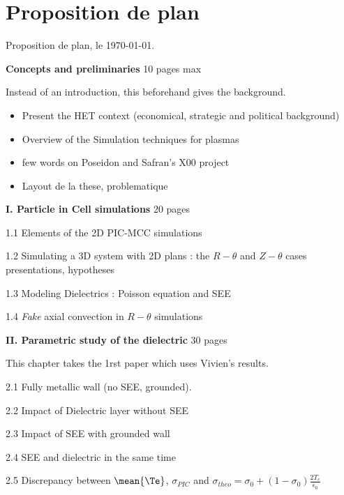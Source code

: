 



\chapter*{Proposition de plan}

Proposition de plan, le \today.
\linebreak

{\bf Concepts and preliminaries} 10 pages max
\begin{zzz}
  Instead of an introduction, this beforehand gives the background.
  \begin{itemize}
    \item Present the HET context (economical, strategic and political background)
    \item Overview of the Simulation techniques for plasmas
    \item few words on {\sc Poseidon} and Safran's X00 project
    \item Layout de la these, problematique
  \end{itemize}
\end{zzz}

{\bf I. Particle in Cell simulations} 20 pages
\begin{zzz}
  1.1 Elements of the 2D PIC-MCC simulations

  1.2 Simulating a 3D system with 2D plans : the {\bf $R-\theta$} and {\bf $Z-\theta$} cases presentations, hypotheses

  1.3 Modeling Dielectrics : Poisson equation and SEE

  1.4 {\it Fake} axial convection in {\bf $R-\theta$} simulations
\end{zzz}

{\bf II. Parametric study of the dielectric} 30 pages
\begin{zzz}
  This chapter takes the 1rst paper which uses Vivien's results.

  2.1 Fully metallic wall (no SEE, grounded).

  2.2 Impact of Dielectric layer without SEE

  2.3 Impact of SEE with grounded wall

  2.4 SEE and dielectric in the same time

  2.5 Discrepancy between $\mean{\Te}$, $\sigma_{PIC}$ and $\sigma_{theo} = \sigma_0 + (1 - \sigma_0) \frac{2 T_e}{\epsilon_0}$
\end{zzz}


